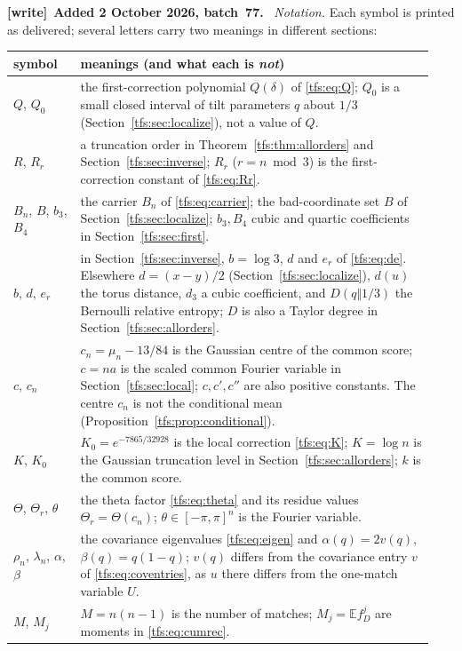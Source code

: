 \documentclass[11pt,a4paper]{article}
\numberwithin{equation}{section}
\theoremstyle{remark}
\newcommand{\E}{\mathbb E}
\newcommand{\1}{\mathbf 1}
\newenvironment{writenote}[1][]{\par\smallskip\begingroup\small
 \noindent\textbf{[write]}\if\relax\detokenize{#1}\relax\else~\textbf{#1.}\fi\ }%
 {\par\endgroup\smallskip}
\begin{document}
\begin{writenote}[Added 2 October 2026, batch~77]
\emph{Notation.} Each symbol is printed as delivered; several letters carry
two meanings in different sections:
\begin{center}\footnotesize
\begin{tabular}{@{}p{0.15\linewidth}p{0.79\linewidth}@{}}
\toprule
symbol & meanings (and what each is \emph{not})\\
\midrule
$Q$, $Q_0$ & the first-correction polynomial $Q(\delta)$ of \eqref{tfs:eq:Q}; $Q_0$ is a small closed interval of tilt parameters $q$ about $1/3$ (Section~\ref{tfs:sec:localize}), not a value of $Q$.\\
$R$, $R_r$ & a truncation order in Theorem~\ref{tfs:thm:allorders} and Section~\ref{tfs:sec:inverse}; $R_r$ ($r=n\bmod3$) is the first-correction constant of \eqref{tfs:eq:Rr}.\\
$B_n$, $B$, $b_3$, $B_4$ & the carrier $B_n$ of \eqref{tfs:eq:carrier}; the bad-coordinate set $B$ of Section~\ref{tfs:sec:localize}; $b_3,B_4$ cubic and quartic coefficients in Section~\ref{tfs:sec:first}.\\
$b$, $d$, $e_r$ & in Section~\ref{tfs:sec:inverse}, $b=\log3$, $d$ and $e_r$ of \eqref{tfs:eq:de}. Elsewhere $d=(x-y)/2$ (Section~\ref{tfs:sec:localize}), $d(u)$ the torus distance, $d_3$ a cubic coefficient, and $D(q\Vert1/3)$ the Bernoulli relative entropy; $D$ is also a Taylor degree in Section~\ref{tfs:sec:allorders}.\\
$c$, $c_n$ & $c_n=\mu_n-13/84$ is the Gaussian centre of the common score; $c=na$ is the scaled common Fourier variable in Section~\ref{tfs:sec:local}; $c,c',c''$ are also positive constants. The centre $c_n$ is not the conditional mean (Proposition~\ref{tfs:prop:conditional}).\\
$K$, $K_0$ & $K_0=e^{-7865/32928}$ is the local correction \eqref{tfs:eq:K}; $K=\log n$ is the Gaussian truncation level in Section~\ref{tfs:sec:allorders}; $k$ is the common score.\\
$\Theta$, $\Theta_r$, $\theta$ & the theta factor \eqref{tfs:eq:theta} and its residue values $\Theta_r=\Theta(c_n)$; $\theta\in[-\pi,\pi]^n$ is the Fourier variable.\\
$\rho_n$, $\lambda_n$, $\alpha$, $\beta$ & the covariance eigenvalues \eqref{tfs:eq:eigen} and $\alpha(q)=2v(q)$, $\beta(q)=q(1-q)$; $v(q)$ differs from the covariance entry $v$ of \eqref{tfs:eq:coventries}, as $u$ there differs from the one-match variable $U$.\\
$M$, $M_j$ & $M=n(n-1)$ is the number of matches; $M_j=\E f_D^j$ are moments in \eqref{tfs:eq:cumrec}.\\

\end{tabular}
\end{center}
\end{writenote}
\end{document}
